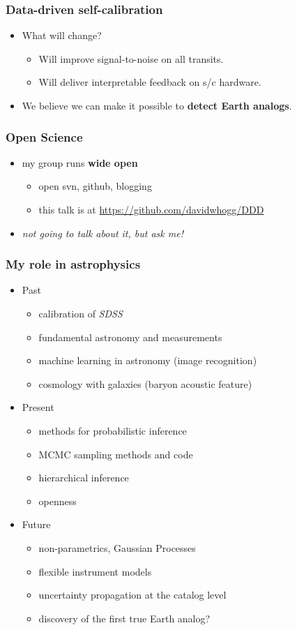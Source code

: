 \documentclass[aspectratio=169]{beamer}
\renewcommand{\emph}[1]{\textbf{#1}}
\newcommand{\project}[1]{\textsl{#1}}
\begin{document}
\begin{frame}
  \frametitle{Data-driven self-calibration}
  \begin{itemize}
  \item What will change?
    \begin{itemize}
    \item Will improve signal-to-noise on all transits.
    \item Will deliver interpretable feedback on s/c hardware.
    \end{itemize}
  \item We believe we can make it possible to \emph{detect Earth analogs}.
  \end{itemize}
\end{frame}

\begin{frame}
  \frametitle{Open Science}
  \begin{itemize}
  \item my group runs \emph{wide open}
    \begin{itemize}
    \item open svn, github, blogging
    \item this talk is at \url{https://github.com/davidwhogg/DDD}
    \end{itemize}
  \item \textit{not going to talk about it, but ask me!}
  \end{itemize}
\end{frame}

\begin{frame}
  \frametitle{My role in astrophysics}
  \begin{itemize}
  \item Past
    \begin{itemize}
    \item calibration of \project{SDSS}
    \item fundamental astronomy and measurements
    \item machine learning in astronomy (image recognition)
    \item cosmology with galaxies (baryon acoustic feature)
    \end{itemize}
  \item Present
    \begin{itemize}
    \item methods for probabilistic inference
    \item MCMC sampling methods and code
    \item hierarchical inference
    \item openness
    \end{itemize}
  \item Future
    \begin{itemize}
    \item non-parametrics, Gaussian Processes
    \item flexible instrument models
    \item uncertainty propagation at the catalog level
    \item discovery of the first true Earth analog?
    \end{itemize}
  \end{itemize}
\end{frame}
\end{document}
